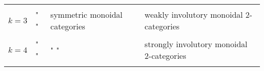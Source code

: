 \documentclass{article}
\begin{document}
\begin{longtable}[]{@{}llll@{}}
\begin{minipage}[t]{0.21\columnwidth}
\strut
\end{minipage}\tabularnewline
\begin{minipage}[t]{0.26\columnwidth}\raggedright
\(k=3\)\strut
\end{minipage} & \begin{minipage}[t]{0.21\columnwidth}\raggedright
" "\strut
\end{minipage} & \begin{minipage}[t]{0.21\columnwidth}\raggedright
symmetric monoidal categories\strut
\end{minipage} & \begin{minipage}[t]{0.21\columnwidth}\raggedright
weakly involutory monoidal 2-categories\strut
\end{minipage}\tabularnewline
\begin{minipage}[t]{0.26\columnwidth}\raggedright
\strut
\end{minipage} & \begin{minipage}[t]{0.21\columnwidth}\raggedright
\strut
\end{minipage} & \begin{minipage}[t]{0.21\columnwidth}\raggedright
\strut
\end{minipage} & \begin{minipage}[t]{0.21\columnwidth}\raggedright
\strut
\end{minipage}\tabularnewline
\begin{minipage}[t]{0.26\columnwidth}\raggedright
\(k=4\)\strut
\end{minipage} & \begin{minipage}[t]{0.21\columnwidth}\raggedright
" "\strut
\end{minipage} & \begin{minipage}[t]{0.21\columnwidth}\raggedright
" "\strut
\end{minipage} & \begin{minipage}[t]{0.21\columnwidth}\raggedright
strongly involutory monoidal 2-categories\strut
\end{minipage}\tabularnewline
\begin{minipage}[t]{0.26\columnwidth}\raggedright
\strut
\end{minipage} & \begin{minipage}[t]{0.21\columnwidth}\raggedright
\strut
\end{minipage} & \begin{minipage}[t]{0.21\columnwidth}\raggedright
\strut
\end{minipage} & \begin{minipage}[t]{0.21\columnwidth}\raggedright

\end{minipage}
\end{longtable}
\end{document}
